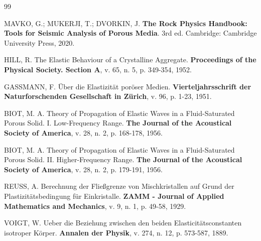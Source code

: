 \begin{thebibliography}{99}
\rhead{\thepage}

MAVKO, G.; MUKERJI, T.; DVORKIN, J. \textbf{The Rock Physics Handbook: Tools for Seismic Analysis of Porous Media}. 3rd ed. Cambridge: Cambridge University Press, 2020.

HILL, R. The Elastic Behaviour of a Crystalline Aggregate. \textbf{Proceedings of the Physical Society. Section A}, v. 65, n. 5, p. 349-354, 1952.

GASSMANN, F. Über die Elastizität poröser Medien. \textbf{Vierteljahrsschrift der Naturforschenden Gesellschaft in Zürich}, v. 96, p. 1-23, 1951.

BIOT, M. A. Theory of Propagation of Elastic Waves in a Fluid-Saturated Porous Solid. I. Low-Frequency Range. \textbf{The Journal of the Acoustical Society of America}, v. 28, n. 2, p. 168-178, 1956.

BIOT, M. A. Theory of Propagation of Elastic Waves in a Fluid-Saturated Porous Solid. II. Higher-Frequency Range. \textbf{The Journal of the Acoustical Society of America}, v. 28, n. 2, p. 179-191, 1956.

REUSS, A. Berechnung der Fließgrenze von Mischkristallen auf Grund der Plastizitätsbedingung für Einkristalle. \textbf{ZAMM - Journal of Applied Mathematics and Mechanics}, v. 9, n. 1, p. 49-58, 1929.

VOIGT, W. Ueber die Beziehung zwischen den beiden Elasticitätsconstanten isotroper Körper. \textbf{Annalen der Physik}, v. 274, n. 12, p. 573-587, 1889.

\end{thebibliography}